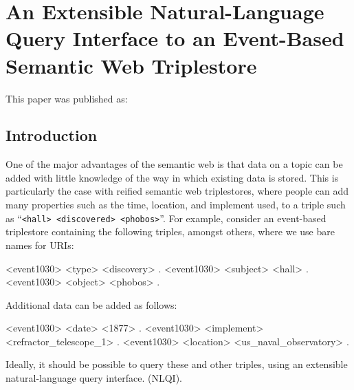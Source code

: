 \documentclass[../main.tex]{subfiles}
\begin{document}
\chapter{An Extensible Natural-Language Query Interface to an Event-Based Semantic Web Triplestore}
\begin{refsection}

\label{chapter:nliwod2018conf}

This paper was published as:



\section{Introduction}

One of the major advantages of the semantic web is that data on a topic can be added with little
knowledge of the way in which existing data is stored. This is particularly the case with reified semantic web
triplestores, where people can add many properties such as the time, location, and implement used, to
a triple such as ``\texttt{<hall> <discovered> <phobos>}''. For example, consider an event-based triplestore containing the following triples, amongst others, where we use bare names for URIs:

\begin{boldcode}
	<event1030> <type> <discovery> .
	<event1030> <subject> <hall> .
	<event1030> <object> <phobos> .
\end{boldcode}

Additional data can be added as follows:

\begin{boldcode}
	<event1030> <date> <1877> .
	<event1030> <implement> <refractor_telescope_1> .
	<event1030> <location> <us_naval_observatory> .
\end{boldcode}

Ideally, it should be possible to query these and other triples, using an extensible natural-language query
interface. (NLQI).


\end{refsection}
\end{document}
